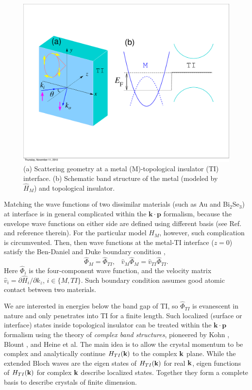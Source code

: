 \begin{figure}
\center
\includegraphics[width=\textwidth]{include/geometry.pdf}
\caption{(a) Scattering geometry at a metal (M)-topological insulator (TI) interface.
(b) Schematic band structure of the metal (modeled by $\hat{H}_M$) and topological insulator.
}
\end{figure}


Matching the wave functions of two dissimilar 
materials (such as Au and Bi$_2$Se$_3$) at interface is in general 
complicated within the $\mathbf{k\cdot p}$ formalism, because the envelope wave functions 
on either side are defined using different basis (see Ref. \cite{bc} and reference therein). 
For the particular model $H_M$, however, such complication
is circumvented. Then, then wave functions at the metal-TI interface ($z=0$) satisfy the Ben-Daniel 
and Duke boundary condition \cite{duke}, 
\[
\hat{\Phi}_M=\hat{\Phi}_{TI}, \;\;\; \hat{v}_M \hat{\Phi}_M = \hat{v}_{TI}\hat{\Phi}_{TI}.
\]
Here $\hat{\Phi}_i$ is the four-component wave function, and 
the velocity matrix $\hat{v}_{i}=\partial \hat{H}_i/\partial k_z$, $i\in \{M, TI\}$. 
Such boundary condition assumes good atomic contact between two materials.

We are interested in energies below the band gap of TI, so 
$\hat{\Phi}_{TI}$ is evanescent in nature and only penetrates into TI 
for a finite length. Such localized (surface or interface) 
states inside topological insulator can be treated within the $\mathbf{k\cdot p}$ formalism 
using the theory of {\it complex band structures}, pioneered by Kohn \cite{kohn59}, Blount \cite{blount62}, 
and Heine \cite{heine63} et al. 
The main idea is to allow the crystal momentum to be complex and analytically continue
$H_{TI}(\mathbf{k})$ to the complex $\mathbf{k}$ plane. 
While the extended Bloch waves are the eigen states of $H_{TI}(\mathbf{k})$ for real $\mathbf{k}$, 
eigen functions of $H_{TI}(\mathbf{k})$ for complex $\mathbf{k}$ describe localized states. Together they
form a complete basis to describe crystals of finite dimension. 

